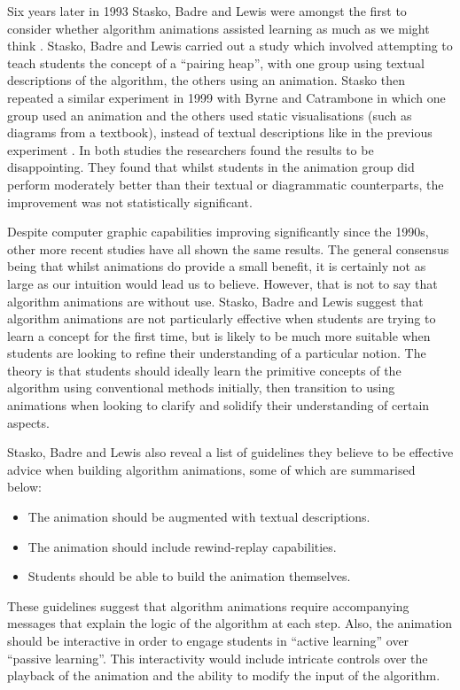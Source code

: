 \documentclass{l4proj}
\begin{document}
Six years later in 1993 Stasko, Badre and Lewis were amongst the first to consider whether algorithm animations assisted learning as much as we might think \cite{StaskoBadreLewis}. Stasko, Badre and Lewis carried out a study which involved attempting to teach students the concept of a ``pairing heap'', with one group using textual descriptions of the algorithm, the others using an animation. Stasko then repeated a similar experiment in 1999 with Byrne and Catrambone in which one group used an animation and the others used static visualisations (such as diagrams from a textbook), instead of textual descriptions like in the previous experiment \cite{StaskoByrneCatrambone}. In both studies the researchers found the results to be disappointing. They found that whilst students in the animation group did perform moderately better than their textual or diagrammatic counterparts, the improvement was not statistically significant.

Despite computer graphic capabilities improving significantly since the 1990s, other more recent studies have all shown the same results. The general consensus being that whilst animations do provide a small benefit, it is certainly not as large as our intuition would lead us to believe. However, that is not to say that algorithm animations are without use. Stasko, Badre and Lewis suggest that algorithm animations are not particularly effective when students are trying to learn a concept for the first time, but is likely to be much more suitable when students are looking to refine their understanding of a particular notion. The theory is that students should ideally learn the primitive concepts of the algorithm using conventional methods initially, then transition to using animations when looking to clarify and solidify their understanding of certain aspects.

Stasko, Badre and Lewis also reveal a list of guidelines they believe to be effective advice when building algorithm animations, some of which are summarised below:
\begin{itemize}
\item The animation should be augmented with textual descriptions.
\item The animation should include rewind-replay capabilities.
\item Students should be able to build the animation themselves.
\end{itemize}
These guidelines suggest that algorithm animations require accompanying messages that explain the logic of the algorithm at each step. Also, the animation should be interactive in order to engage students in ``active learning'' over ``passive learning''. This interactivity would include intricate controls over the playback of the animation and the ability to modify the input of the algorithm.
\end{document}

